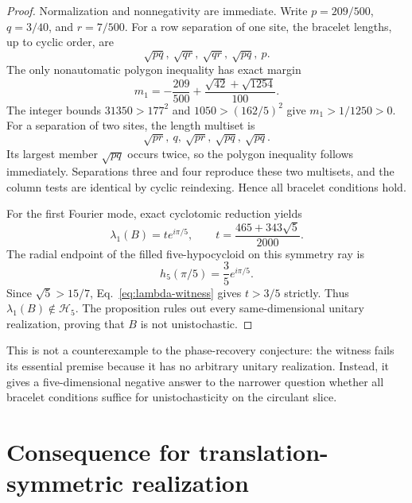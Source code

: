 \documentclass[aip,jmp,preprint,onecolumn,nofootinbib]{revtex4-2}
\begin{document}
\begin{proof}
Normalization and nonnegativity are immediate.  Write
$p=209/500$, $q=3/40$, and $r=7/500$.  For a row separation of one site, the
bracelet lengths, up to cyclic order, are
\begin{equation}
 \sqrt{pq},\ \sqrt{qr},\ \sqrt{qr},\ \sqrt{pq},\ p.
 \label{eq:lengths-one}
\end{equation}
The only nonautomatic polygon inequality has exact margin
\begin{equation}
 m_1=-\frac{209}{500}+\frac{\sqrt{42}+\sqrt{1254}}{100}.
 \label{eq:margin-one}
\end{equation}
The integer bounds $31350>177^2$ and
$1050>(162/5)^2$ give $m_1>1/1250>0$.  For a separation of two sites, the
length multiset is
\begin{equation}
 \sqrt{pr},\ q,\ \sqrt{pr},\ \sqrt{pq},\ \sqrt{pq}.
 \label{eq:lengths-two}
\end{equation}
Its largest member $\sqrt{pq}$ occurs twice, so the polygon inequality follows
immediately.  Separations three and four reproduce these two multisets, and
the column tests are identical by cyclic reindexing.  Hence all bracelet
conditions hold.

For the first Fourier mode, exact cyclotomic reduction yields
\begin{equation}
 \lambda_1(B)=t e^{i\pi/5},\qquad
 t=\frac{465+343\sqrt{5}}{2000}.
 \label{eq:lambda-witness}
\end{equation}
The radial endpoint of the filled five-hypocycloid on this symmetry ray is
\begin{equation}
 h_5(\pi/5)=\frac{3}{5}e^{i\pi/5}.
 \label{eq:radial-boundary}
\end{equation}
Since $\sqrt5>15/7$, Eq.~\eqref{eq:lambda-witness} gives $t>3/5$ strictly.
Thus $\lambda_1(B)\notin\mathcal H_5$.  The proposition rules out every
same-dimensional unitary realization, proving that $B$ is not unistochastic.
\end{proof}

This is not a counterexample to the phase-recovery conjecture: the witness
fails its essential premise because it has no arbitrary unitary realization.
Instead, it gives a five-dimensional negative answer to the narrower question
whether all bracelet conditions suffice for unistochasticity on the circulant
slice.

\section{Consequence for translation-symmetric realization}
\end{document}
